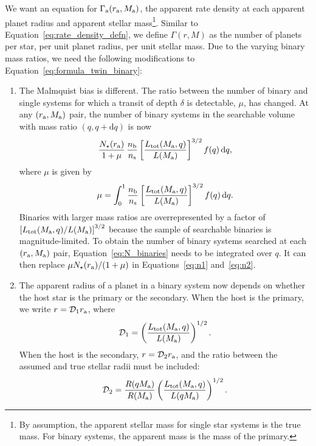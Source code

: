 \documentclass[12pt,modern]{aastex61}
\renewcommand{\a}{_{\rm a}}
\begin{document}
We want an equation for $\Gamma\a(r\a,M\a)$, the apparent rate density
at each apparent planet radius and apparent stellar mass\footnote{By
assumption, the apparent stellar mass for single star systems is the
true mass. For binary systems, the apparent mass is the mass of the
primary.}.
Similar to Equation~\ref{eq:rate_density_defn}, we define
$\Gamma(r,M)$ as the number of planets per star, per unit planet radius,
per unit stellar mass.  Due to the varying binary mass ratios, we need
the following modifications to Equation~\ref{eq:formula_twin_binary}:
%
\begin{enumerate}
%
\item The Malmquist bias is different. The ratio between the number of
binary and single systems for which a transit of depth $\delta$ is
detectable, $\mu$, has changed.  At any $(r\a,M\a)$ pair, the number
of binary systems in the searchable volume with mass ratio $(q,
q+\mathrm{d}q)$ is now
\begin{equation}
    {N_\star(r\a)\over{1+\mu}} \, {n_{\rm b}\over n_{\rm s}}
    \left[{L_{\rm tot}(M\a, q) \over L(M\a)}\right]^{3/2}
    f(q)\,\mathrm{d}q,
    \label{eq:N_binaries}
\end{equation}
where $\mu$ is given by
\begin{equation}
    \mu= 
    \int_0^1 {n_{\rm b}\over n_{\rm s}}\left[{L_{\rm tot}(M\a, q)
    \over L(M\a)}\right]^{3/2} f(q)\,\mathrm{d}q.
    \label{eq:mu_general}
\end{equation}
Binaries with larger mass ratios are overrepresented by a factor of
$\left[{L_{\rm tot}(M\a, q)/L(M\a)}\right]^{3/2}$ because the
sample of searchable binaries is magnitude-limited.  To obtain
the number of binary systems searched at each $(r\a,M\a)$ pair,
Equation~\ref{eq:N_binaries} needs to be integrated over $q$.  It
can then replace ${\mu N_\star(r\a)/(1+\mu)}$ in
Equations~\ref{eq:n1} and~\ref{eq:n2}.

\item The apparent radius of a planet in a binary system now depends
on whether the host star is the primary or the secondary. When the host
is the primary, we write
$r=\mathcal{D}_1 r\a$, where
\begin{equation}
    \mathcal{D}_1
    = \left( \frac{ L_{\rm tot}(M\a, q)}{ L(M\a) } \right)^{1/2}.
    \label{eq:dil_1}
\end{equation}
When the host is the secondary, $r=\mathcal{D}_2 r\a$, and the
ratio between the assumed and true stellar radii must be included:
\begin{equation}
  \mathcal{D}_2
  = \frac{R(qM\a)}{R(M\a)}
    \left( \frac{L_{\rm tot}(M\a, q)}{L(qM\a)} \right)^{1/2}.
  \label{eq:dil_2}
\end{equation}


\end{enumerate}
\end{document}
